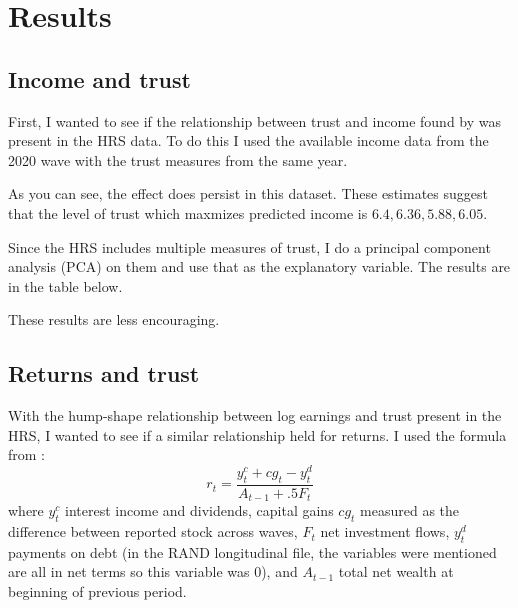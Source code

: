 \onlyinsubfile{\setcounter{section}{3}}
\section{Results}\notinsubfile{\label{sec:results}}

\subsection{Income and trust}

\par First, I wanted to see if the  relationship between trust and income found by \cite{jbpglg2016} was present in the HRS data. To do this I used the available income data from the 2020 wave with the trust measures from the same year.






\par As you can see, the effect does persist in this dataset. These estimates suggest that the level of trust which maxmizes predicted income is $6.4, 6.36, 5.88, 6.05$.

\par Since the HRS includes multiple measures of trust, I do a principal component analysis (PCA) on them and use that as the explanatory variable. The results are in the table below.





\par These results are less encouraging. 

\subsection{Returns and trust}

\par With the hump-shape relationship between log earnings and trust present in the HRS, I wanted to see if a similar relationship held for returns. I used the formula from \cite{Daminato2024}: $$ r_t = \frac{y^c_t + cg_t -y^d_t}{A_{t-1} + .5F_t}   $$ where $y^c_t$ interest income and dividends, capital gains $cg_t$ measured as the difference between reported stock across waves, $F_t$ net investment flows, $y^d_t$ payments on debt (in the RAND longitudinal file, the variables were mentioned are all in net terms so this variable was $0$), and $A_{t-1}$ total net wealth at beginning of previous period.

